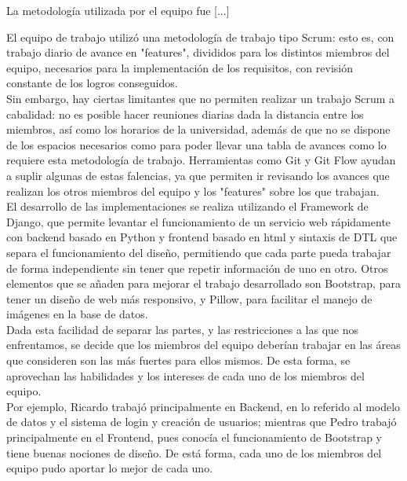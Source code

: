 La metodología utilizada por el equipo fue [...]

\iffalse

El equipo de trabajo utilizó una metodología de trabajo tipo Scrum: esto es, con trabajo diario de avance en "features", divididos para los distintos miembros del equipo, necesarios para la implementación de los requisitos, con revisión constante de los logros conseguidos. \\
Sin embargo, hay ciertas limitantes que no permiten realizar un trabajo Scrum a cabalidad: no es posible hacer reuniones diarias dada la distancia entre los miembros, así como los horarios de la universidad, además de que no se dispone de los espacios necesarios como para poder llevar una tabla de avances como lo requiere esta metodología de trabajo. Herramientas como Git y Git Flow ayudan a suplir algunas de estas falencias, ya que permiten ir revisando los avances que realizan los otros miembros del equipo y los "features" sobre los que trabajan.\\
El desarrollo de las implementaciones se realiza utilizando el Framework de Django, que permite levantar el funcionamiento de un servicio web rápidamente con backend basado en Python y frontend basado en html y sintaxis de DTL que separa el funcionamiento del diseño, permitiendo que cada parte pueda trabajar de forma independiente sin tener que repetir información de uno en otro. Otros elementos que se añaden para mejorar el trabajo desarrollado son Bootstrap, para tener un diseño de web más responsivo, y Pillow, para facilitar el manejo de imágenes en la base de datos. \\
Dada esta facilidad de separar las partes, y las restricciones a las que nos enfrentamos, se decide que los miembros del equipo deberían trabajar en las áreas que consideren son las más fuertes para ellos mismos. De esta forma, se aprovechan las habilidades y los intereses de cada uno de los miembros del equipo. \\
Por ejemplo, Ricardo trabajó principalmente en Backend, en lo referido al modelo de datos y el sistema de login y creación de usuarios; mientras que Pedro trabajó principalmente en el Frontend, pues conocía el funcionamiento de Bootstrap y tiene buenas nociones de diseño. De está forma, cada uno de los miembros del equipo pudo aportar lo mejor de cada uno. \\


